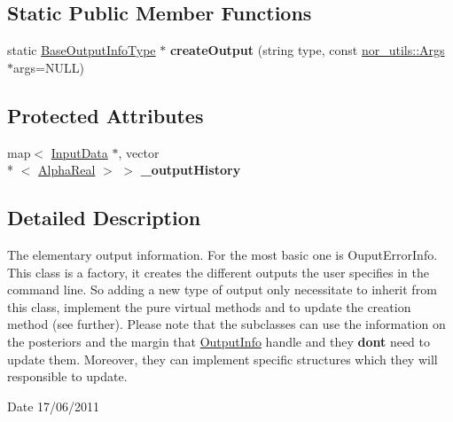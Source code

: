 \subsection*{Static Public Member Functions}
\begin{DoxyCompactItemize}
\item 
\hypertarget{classMultiBoost_1_1BaseOutputInfoType_af71d1583812f0fbc2fc41e88977f532d}{static \hyperlink{classMultiBoost_1_1BaseOutputInfoType}{Base\-Output\-Info\-Type} $\ast$ {\bfseries create\-Output} (string type, const \hyperlink{classnor__utils_1_1Args}{nor\-\_\-utils\-::\-Args} $\ast$args=N\-U\-L\-L)}\label{classMultiBoost_1_1BaseOutputInfoType_af71d1583812f0fbc2fc41e88977f532d}

\end{DoxyCompactItemize}
\subsection*{Protected Attributes}
\begin{DoxyCompactItemize}
\item 
\hypertarget{classMultiBoost_1_1BaseOutputInfoType_a157929472287a1dc8527153800453b98}{map$<$ \hyperlink{classMultiBoost_1_1InputData}{Input\-Data} $\ast$, vector\\*
$<$ \hyperlink{Defaults_8h_a80184c4fd10ab70a1a17c5f97dcd1563}{Alpha\-Real} $>$ $>$ {\bfseries \-\_\-output\-History}}\label{classMultiBoost_1_1BaseOutputInfoType_a157929472287a1dc8527153800453b98}

\end{DoxyCompactItemize}


\subsection{Detailed Description}
The elementary output information. For the most basic one is Ouput\-Error\-Info. This class is a factory, it creates the different outputs the user specifies in the command line. So adding a new type of output only necessitate to inherit from this class, implement the pure virtual methods and to update the creation method (see further). Please note that the subclasses can use the information on the posteriors and the margin that \hyperlink{classMultiBoost_1_1OutputInfo}{Output\-Info} handle and they {\bfseries dont} need to update them. Moreover, they can implement specific structures which they will responsible to update.

\begin{DoxyDate}{Date}
17/06/2011 
\end{DoxyDate}


